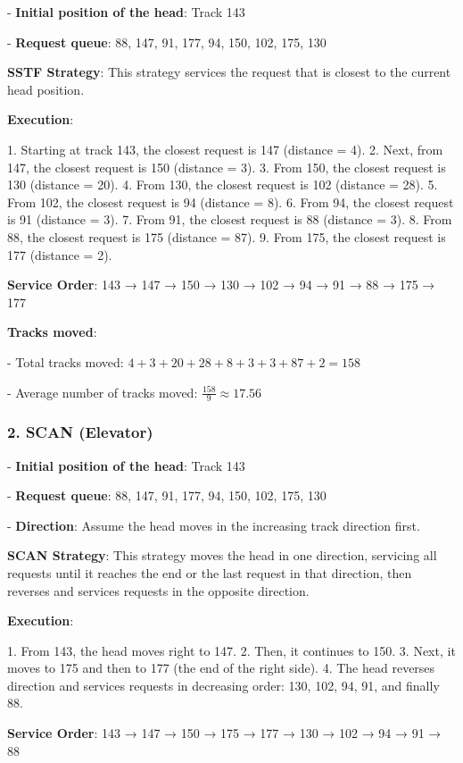 \documentclass[a4paper]{book}
\begin{document}
- \textbf{Initial position of the head}: Track 143

- \textbf{Request queue}: 88, 147, 91, 177, 94, 150, 102, 175, 130


\textbf{SSTF Strategy}:
This strategy services the request that is closest to the current head position.

\textbf{Execution}:

1. Starting at track 143, the closest request is 147 (distance = 4).
2. Next, from 147, the closest request is 150 (distance = 3).
3. From 150, the closest request is 130 (distance = 20).
4. From 130, the closest request is 102 (distance = 28).
5. From 102, the closest request is 94 (distance = 8).
6. From 94, the closest request is 91 (distance = 3).
7. From 91, the closest request is 88 (distance = 3).
8. From 88, the closest request is 175 (distance = 87).
9. From 175, the closest request is 177 (distance = 2).

\textbf{Service Order}: 143 → 147 → 150 → 130 → 102 → 94 → 91 → 88 → 175 → 177

\textbf{Tracks moved}:

- Total tracks moved: \(4 + 3 + 20 + 28 + 8 + 3 + 3 + 87 + 2 = 158\)

- Average number of tracks moved: \(\frac{158}{9} \approx 17.56\)


\subsubsection{2. \textbf{SCAN (Elevator)}}

- \textbf{Initial position of the head}: Track 143

- \textbf{Request queue}: 88, 147, 91, 177, 94, 150, 102, 175, 130

- \textbf{Direction}: Assume the head moves in the increasing track direction first.


\textbf{SCAN Strategy}:
This strategy moves the head in one direction, servicing all requests until it reaches the end or the last request in that direction, then reverses and services requests in the opposite direction.

\textbf{Execution}:

1. From 143, the head moves right to 147.
2. Then, it continues to 150.
3. Next, it moves to 175 and then to 177 (the end of the right side).
4. The head reverses direction and services requests in decreasing order: 130, 102, 94, 91, and finally 88.

\textbf{Service Order}: 143 → 147 → 150 → 175 → 177 → 130 → 102 → 94 → 91 → 88
\end{document}
